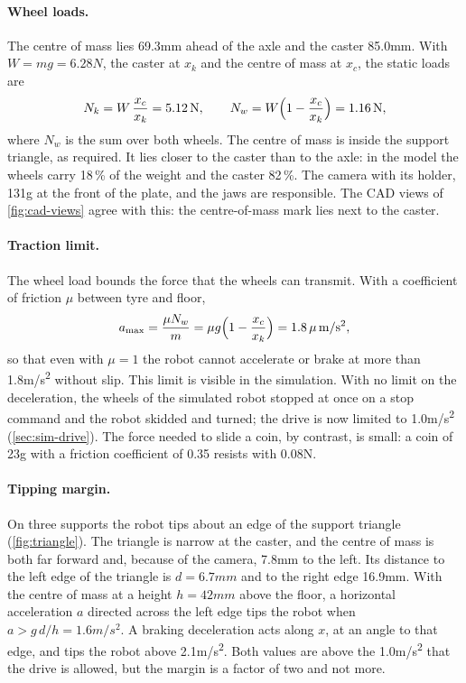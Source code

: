 \paragraph{Wheel loads.} The centre of mass lies 69.3\unit{mm} ahead of the axle and the
caster 85.0\unit{mm}. With $W=mg=6.28\unit{N}$, the caster at $x_k$ and the centre of mass
at $x_c$, the static loads are
\begin{equation}
  N_k = W\,\frac{x_c}{x_k} = 5.12\,\mathrm{N}, \qquad
  N_w = W\Bigl(1-\frac{x_c}{x_k}\Bigr) = 1.16\,\mathrm{N},
  \label{eq:loads}
\end{equation}
where $N_w$ is the sum over both wheels. The centre of mass is inside the support triangle,
as required. It lies closer to the caster than to the axle: in the model the wheels carry 18\,\% of the
weight and the caster 82\,\%. The camera with its holder, 131\unit{g} at the front of the
plate, and the jaws are responsible. The CAD views of \cref{fig:cad-views} agree with this:
the centre-of-mass mark lies next to the caster.

\paragraph{Traction limit.} The wheel load bounds the force that the wheels can transmit.
With a coefficient of friction $\mu$ between tyre and floor,
\begin{equation}
  a_{\max} = \frac{\mu N_w}{m} = \mu g\Bigl(1-\frac{x_c}{x_k}\Bigr) = 1.8\,\mu\,\mathrm{m/s^2},
  \label{eq:traction}
\end{equation}
so that even with $\mu=1$ the robot cannot accelerate or brake at more than
1.8\unit{m/s^2} without slip. This limit is visible in the simulation. With no limit on the
deceleration, the wheels of the simulated robot stopped at once on a stop command and the
robot skidded and turned; the drive is now limited to 1.0\unit{m/s^2}
(\cref{sec:sim-drive}). The force needed to slide a coin, by contrast, is small: a coin of
23\unit{g} with a friction coefficient of 0.35 resists with 0.08\unit{N}.

\paragraph{Tipping margin.} On three supports the robot tips about an edge of the support
triangle (\cref{fig:triangle}). The triangle is narrow at the caster, and the centre of mass
is both far forward and, because of the camera, 7.8\unit{mm} to the left. Its distance to
the left edge of the triangle is $d=6.7\unit{mm}$ and to the right edge 16.9\unit{mm}. With
the centre of mass at a height $h=42\unit{mm}$ above the floor, a horizontal acceleration
$a$ directed across the left edge tips the robot when $a>g\,d/h=1.6\unit{m/s^2}$. A braking
deceleration acts along $x$, at an angle to that edge, and tips the robot above
2.1\unit{m/s^2}. Both values are above the 1.0\unit{m/s^2} that the drive is allowed, but
the margin is a factor of two and not more.


